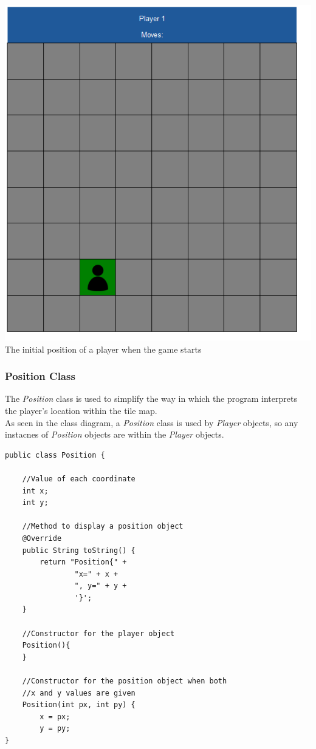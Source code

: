 \documentclass[a4paper,12pt]{extarticle}
\begin{document}
\begin{center}
\includegraphics[width=\textwidth]{BasicMap1.png}\\
The initial position of a player when the game starts
\end{center}

\newpage
\subsubsection{Position Class}

The \textit{Position} class is used to simplify the way in which the program interprets the player's location within the tile map.\\

\noindent As seen in the class diagram, a \textit{Position} class is used by \textit{Player} objects, so any instacnes of \textit{Position} objects are within the \textit{Player} objects.

\begin{lstlisting}
public class Position {

    //Value of each coordinate
    int x;
    int y;

    //Method to display a position object
    @Override
    public String toString() {
        return "Position{" +
                "x=" + x +
                ", y=" + y +
                '}';
    }

    //Constructor for the player object
    Position(){
    }

    //Constructor for the position object when both 
    //x and y values are given
    Position(int px, int py) {
        x = px;
        y = py;
}
\end{lstlisting}
\vspace{4mm}
\end{document}

